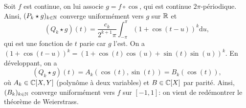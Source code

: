 \documentclass[12pt]{article}
\begin{document}
\begin{remark}
    Soit 
    $f$ est continue, on lui associe $g=f\circ \cos$, qui est continue $2\pi$-périodique. Ainsi, $(P_{k}\star g)_{k\in\mathbb{N}}$ converge uniformément vers $g$ sur $\mathbb{R}$ et 
    \begin{equation}
        (Q_{k}\star g)(t)=\frac{c_{k}}{2^{k+1}\pi}\int_{-\pi}^{\pi}\left(1+\cos(t-u)\right)^{k}\mathrm{d}u,
    \end{equation}
    qui est une fonction de $t$ parie car $g$ l'est. On a $(1+\cos(t-u))^{k}=\left(1+\cos(t)\cos(u)+\sin(t)\sin(u)\right)^{k}$. En développant, on a
    \begin{equation}
        (Q_{k}\star g)(t)=A_{k}(\cos(t),\sin(t))=B_{k}(\cos(t)),
    \end{equation}
    où $A_{k}\in\mathbb{C}[X,Y]$ (polynôme à deux variables) et $B\in\mathbb{C}[X]$ par parité. Ainsi, $(B_{k})_{k\in\mathbb{N}}$ converge uniformément vers $f$ sur $[-1,1]$: on vient de redémontrer le théorème de Weierstrass.
\end{remark}
\end{document}
